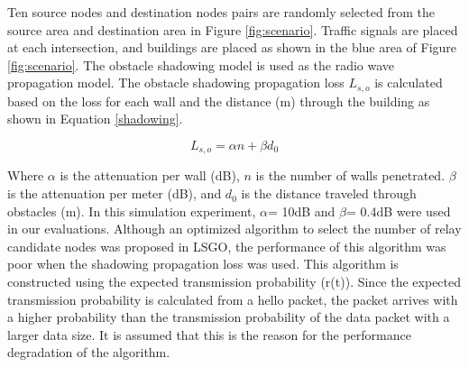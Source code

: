 \documentclass[conference]{IEEEtran}
\begin{document}
Ten source nodes and destination nodes pairs  are randomly selected from the source area and destination area in Figure \ref{fig:scenario}.
 Traffic signals are placed at each intersection, and buildings are placed as shown in the blue area of Figure \ref{fig:scenario}. 
The obstacle shadowing model \cite{20} is used as the radio wave propagation model. The obstacle shadowing propagation loss $L_{s,o}$ is calculated based on the loss for each wall and the distance (m) through the building as shown in Equation \ref{shadowing}.

\begin{equation}
\label{shadowing}
L_{s,o} = \alpha n  + \beta d_0
\end{equation}

Where $\alpha$ is the attenuation per wall (dB), $n$ is the number of walls penetrated. 
$\beta$ is the attenuation per meter (dB), and $d_0$ is the distance traveled through obstacles (m). 
In this simulation experiment, $\alpha$= 10dB and $\beta$= 0.4dB were used in our evaluations. 
Although an optimized algorithm to select the number of relay candidate nodes was proposed in LSGO, the performance of this algorithm was poor when the shadowing propagation loss was used. 
This algorithm is constructed using the expected transmission probability (r(t)). Since the expected transmission probability is calculated from a hello packet, the packet arrives with a higher probability than the transmission probability of the data packet with a larger data size. It is assumed that this is the reason for the performance degradation of the algorithm. 
\end{document}
